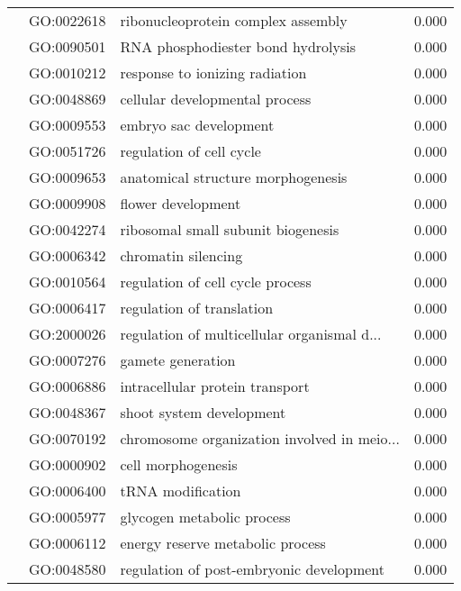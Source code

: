 \begin{longtable}{lllr}
   & GO:0022618 &           ribonucleoprotein complex assembly &         0.000 \\
   & GO:0090501 &           RNA phosphodiester bond hydrolysis &         0.000 \\
   & GO:0010212 &               response to ionizing radiation &         0.000 \\
   & GO:0048869 &               cellular developmental process &         0.000 \\
   & GO:0009553 &                       embryo sac development &         0.000 \\
   & GO:0051726 &                     regulation of cell cycle &         0.000 \\
   & GO:0009653 &           anatomical structure morphogenesis &         0.000 \\
   & GO:0009908 &                           flower development &         0.000 \\
   & GO:0042274 &           ribosomal small subunit biogenesis &         0.000 \\
   & GO:0006342 &                          chromatin silencing &         0.000 \\
   & GO:0010564 &             regulation of cell cycle process &         0.000 \\
   & GO:0006417 &                    regulation of translation &         0.000 \\
   & GO:2000026 &  regulation of multicellular organismal d... &         0.000 \\
   & GO:0007276 &                            gamete generation &         0.000 \\
   & GO:0006886 &              intracellular protein transport &         0.000 \\
   & GO:0048367 &                     shoot system development &         0.000 \\
   & GO:0070192 &  chromosome organization involved in meio... &         0.000 \\
   & GO:0000902 &                           cell morphogenesis &         0.000 \\
   & GO:0006400 &                            tRNA modification &         0.000 \\
   & GO:0005977 &                   glycogen metabolic process &         0.000 \\
   & GO:0006112 &             energy reserve metabolic process &         0.000 \\
   & GO:0048580 &     regulation of post-embryonic development &         0.000 \\

\end{longtable}
